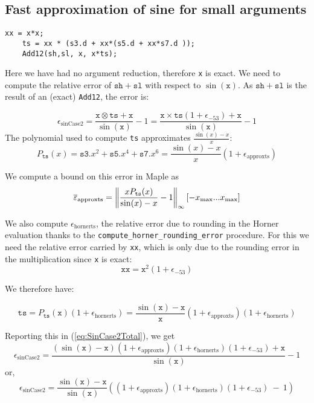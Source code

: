 \subsection{Fast approximation of sine for small arguments \label{sec:trigo:fastsine}}

\begin{lstlisting}[caption={Sine, case 2},firstnumber=1]
    xx = x*x;
    ts = xx * (s3.d + xx*(s5.d + xx*s7.d ));
    Add12(sh,sl, x, x*ts);
\end{lstlisting}

Here we have had no argument reduction, therefore \texttt{x} is exact.
We need to compute the relative error of $\mathtt{sh}+\mathtt{sl}$
with respect to $\sin(\mathtt{x})$. As $\mathtt{sh}+\mathtt{sl}$ is
the result of an (exact) \texttt{Add12}, the error is:

\begin{equation}
  \epsilon_{\mathrm{sinCase2}} = \frac{\mathtt{x}\otimes \mathtt{ts} + \mathtt{x}}{\sin(\mathtt{x})} -1 = \frac{\mathtt{x}\times\mathtt{ts}(1+\epsilon_{-53}) + \mathtt{x}}{\sin(\mathtt{x})} -1
\label{eq:SinCase2Total}
\end{equation}
The polynomial used to compute \texttt{ts}
approximates $\frac{\sin(x)-x}{x}$: 
$$
P_{\mathtt{ts}}(x) = \mathtt{s3}.x^2 + \mathtt{s5}.x^4 + \mathtt{s7}.x^6
= \frac{\sin(x)-x}{x}(1+\epsilon_{\mathrm{approxts}})
$$

We compute a bound on this error in Maple as 
$${\overline{\varepsilon}}_{\mathrm{approxts}} = \left\Vert \frac{xP_{\mathtt{ts}}(x)}{\sin(x)-x} -1 \right\Vert_{\infty}[-x_{\mathrm{max}}...x_{\mathrm{max}}]$$

We also compute $\epsilon_{\mathrm{hornerts}}$, the relative error due
to rounding in the Horner evaluation thanks to the
\texttt{compute\_horner\_rounding\_error} procedure. For this we need
the relative error carried by \texttt{xx}, which is only due to the
rounding error in the multiplication since \texttt{x} is exact:
$$\mathtt{xx}=\mathtt{x}^2(1+\epsilon_{-53})$$

We therefore have:

$$\mathtt{ts} = P_{\mathtt{ts}}(\mathtt{x})(1+\epsilon_{\mathrm{hornerts}}) = \frac{\sin(\mathtt{x})-\mathtt{x}}{\mathtt{x}}(1+\epsilon_{\mathrm{approxts}})(1+\epsilon_{\mathrm{hornerts}})$$

Reporting this in (\ref{eq:SinCase2Total}), we get 
\begin{equation*}
  \epsilon_{\mathrm{sinCase2}} = \frac{(\sin(\mathtt{x})-\mathtt{x})(1+\epsilon_{\mathrm{approxts}})(1+\epsilon_{\mathrm{hornerts}})(1+\epsilon_{-53}) + \mathtt{x}}{\sin(\mathtt{x})} -1
\end{equation*}
or,
\begin{equation*}
  \epsilon_{\mathrm{sinCase2}} =  \frac{\sin(\mathtt{x})-\mathtt{x}}{\sin(\mathtt{x})}\left((1+\epsilon_{\mathrm{approxts}})(1+\epsilon_{\mathrm{hornerts}})(1+\epsilon_{-53})\ -\ 1\right)
\end{equation*}

